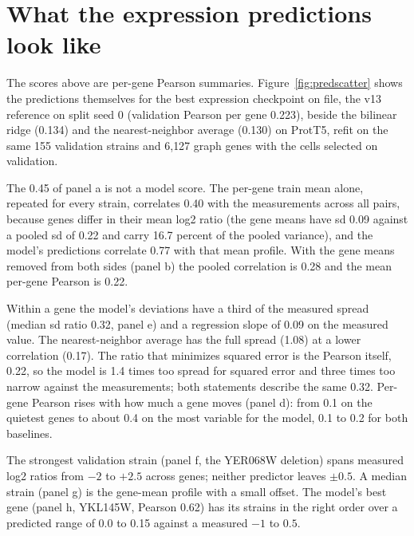 
\clearpage
\section{What the expression predictions look like}

The scores above are per-gene Pearson summaries. Figure~\ref{fig:predscatter} shows the
predictions themselves for the best expression checkpoint on file, the v13 reference on
split seed 0 (validation Pearson per gene 0.223), beside the bilinear ridge (0.134) and the
nearest-neighbor average (0.130) on ProtT5, refit on the same 155 validation strains and
6{,}127 graph genes with the cells selected on validation.

 The 0.45 of panel a is not a model
score. The per-gene train mean alone, repeated for every strain, correlates 0.40 with the
measurements across all pairs, because genes differ in their mean log2 ratio (the gene means
have sd 0.09 against a pooled sd of 0.22 and carry 16.7 percent of the pooled variance), and
the model's predictions correlate 0.77 with that mean profile. With the gene means removed
from both sides (panel b) the pooled correlation is 0.28 and the mean per-gene Pearson is
0.22.

 Within a gene the model's deviations have a third of the
measured spread (median sd ratio 0.32, panel e) and a regression slope of 0.09 on the
measured value. The nearest-neighbor average has the full spread (1.08) at a lower
correlation (0.17). The ratio that minimizes squared error is the Pearson itself, 0.22, so
the model is 1.4 times too spread for squared error and three times too narrow against the
measurements; both statements describe the same 0.32. Per-gene Pearson rises with how much a
gene moves (panel d): from 0.1 on the quietest genes to about 0.4 on the most variable for
the model, 0.1 to 0.2 for both baselines.

 The strongest validation strain (panel f,
the YER068W deletion) spans measured log2 ratios from $-2$ to $+2.5$ across genes; neither
predictor leaves $\pm 0.5$. A median strain (panel g) is the gene-mean profile with a small
offset. The model's best gene (panel h, YKL145W, Pearson 0.62) has its strains in the right
order over a predicted range of 0.0 to 0.15 against a measured $-1$ to $0.5$.

